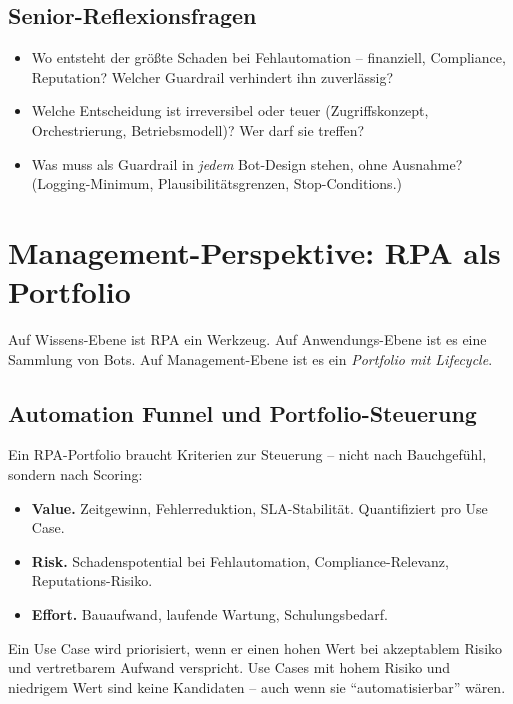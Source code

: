 \documentclass[11pt,a4paper,oneside]{article}
\begin{document}
\subsection{Senior-Reflexionsfragen}

\begin{itemize}
  \item Wo entsteht der größte Schaden bei Fehlautomation -- finanziell, Compliance, Reputation? Welcher Guardrail verhindert ihn zuverlässig?
  \item Welche Entscheidung ist irreversibel oder teuer (Zugriffskonzept, Orchestrierung, Betriebsmodell)? Wer darf sie treffen?
  \item Was muss als Guardrail in \emph{jedem} Bot-Design stehen, ohne Ausnahme? (Logging-Minimum, Plausibilitätsgrenzen, Stop-Conditions.)
\end{itemize}

\section{Management-Perspektive: RPA als Portfolio}

Auf Wissens-Ebene ist RPA ein Werkzeug. Auf Anwendungs-Ebene ist es eine Sammlung von Bots. Auf Management-Ebene ist es ein \emph{Portfolio mit Lifecycle}.

\subsection{Automation Funnel und Portfolio-Steuerung}

Ein RPA-Portfolio braucht Kriterien zur Steuerung -- nicht nach Bauchgefühl, sondern nach Scoring:

\begin{itemize}
  \item \textbf{Value.} Zeitgewinn, Fehlerreduktion, SLA-Stabilität. Quantifiziert pro Use Case.
  \item \textbf{Risk.} Schadenspotential bei Fehlautomation, Compliance-Relevanz, Reputations-Risiko.
  \item \textbf{Effort.} Bauaufwand, laufende Wartung, Schulungsbedarf.
\end{itemize}

Ein Use Case wird priorisiert, wenn er einen hohen Wert bei akzeptablem Risiko und vertretbarem Aufwand verspricht. Use Cases mit hohem Risiko und niedrigem Wert sind keine Kandidaten -- auch wenn sie ``automatisierbar'' wären.
\end{document}
